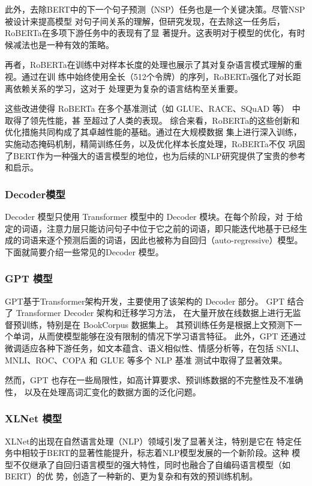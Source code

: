 此外，去除BERT中的下一个句子预测（NSP）任务也是一个关键决策。尽管NSP被设计来提高模型
对句子间关系的理解，但研究发现，在去除这一任务后，RoBERTa在多项下游任务中的表现有了显
著提升。这表明对于模型的优化，有时候减法也是一种有效的策略。

再者，RoBERTa在训练中对样本长度的处理也展示了其对复杂语言模式理解的重视。通过在训
练中始终使用全长（512个令牌）的序列，RoBERTa强化了对长距离依赖关系的学习，这对于
处理更为复杂的语言结构至关重要。

这些改进使得 RoBERTa 在多个基准测试（如 GLUE、RACE\cite{lai2017race}、SQuAD 等）
中取得了领先性能，甚
至超过了人类的表现。
综合来看，RoBERTa的这些创新和优化措施共同构成了其卓越性能的基础。通过在大规模数据
集上进行深入训练，实施动态掩码机制，精简训练任务，以及优化样本长度处理，RoBERTa不仅
巩固了BERT作为一种强大的语言模型的地位，也为后续的NLP研究提供了宝贵的参考和启示。


\subsubsection*{Decoder模型}
Decoder 模型只使用 Transformer 模型中的 Decoder 模块。在每个阶段，对
于给定的词语，注意力层只能访问句子中位于它之前的词语，即只能迭代地基于已经生
成的词语来逐个预测后面的词语，因此也被称为自回归（auto-regressive）模型。
下面就简要介绍一些常见的Decoder 模型。

\subsubsection*{GPT 模型}
GPT基于Transformer架构开发，主要使用了该架构的 Decoder 部分。
GPT 结合了 Transformer Decoder 架构和迁移学习方法，
在大量开放在线数据上进行无监督预训练，特别是在 BookCorpus 数据集上。
其预训练任务是根据上文预测下一个单词，从而使模型能够在没有限制的情况下学习语言特征。
此外，GPT 还通过微调适应各种下游任务，如文本蕴含、语义相似性、情感分析等，在包括
SNLI、MNLI、ROC、COPA 和 GLUE 等多个 NLP 基准
测试中取得了显著效果。

然而，GPT 也存在一些局限性，如高计算要求、预训练数据的不完整性及不准确性，
以及在处理高词汇变化的数据方面的泛化问题。

\subsubsection*{XLNet 模型}
XLNet的出现在自然语言处理（NLP）领域引发了显著关注，特别是它在
特定任务中相较于BERT的显著性能提升，标志着NLP模型发展的一个新阶段。这种
模型不仅继承了自回归语言模型的强大特性，同时也融合了自编码语言模型（如BERT）的优
势，创造了一种新的、更为复杂和有效的预训练机制。

